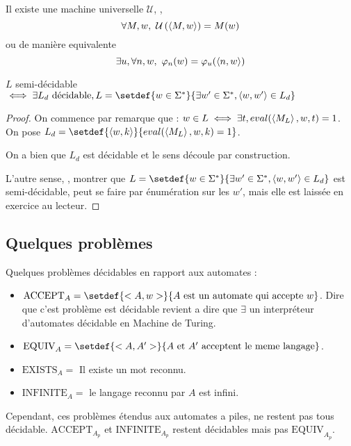 \begin{lemma}\label{lem:univ}
	Il existe une machine universelle $\mathcal U$, \ie, $$\forall M,w, \  \mathcal U \left(\left\langle M,w\right\rangle\right) = M (w)$$
	ou de manière equivalente
	$$\exists u, \forall n,w, \ \varphi_n(w) = \varphi_u(\left\langle n,w\right\rangle)$$
\end{lemma}



\begin{prop}
	$L$ semi-décidable $\iff \exists L_d \text{ décidable}, L = \setdef {w \in \mots} {\exists w' \in \mots, \encode{w,w'} \in L_d}$
\end{prop}


\begin{proof}
	On commence par remarque que : $w \in L \iff \exists t, eval(\left\langle M_L\right\rangle, w, t) = 1$. On pose
	$L_d = \setdef {\encode{w, k}} {eval(\encode {M_L}, w,k) = 1}$.

	On a bien que $L_d$ est décidable et le sens \bimpLR découle par construction.

	L'autre sense, \ie, montrer que $L = \setdef {w \in \mots} {\exists w' \in \mots, \encode{w,w'} \in L_d}$ est semi-décidable,
	peut se faire par énumération sur les $w'$, mais elle est laissée en exercice au lecteur.
\end{proof}


\subsection{Quelques problèmes}

Quelques problèmes décidables en rapport aux automates :

\begin{itemize}
	\item $\text{ACCEPT}_A = \setdef {<A,w>} {A \text { est un automate qui accepte } w}$.
	      Dire que c'est problème est décidable revient a dire que $\exists$ un interpréteur d'automates décidable en Machine de Turing.
	\item $\text{EQUIV}_A = \setdef {<A,A'>} {A \text { et } A' \text{ acceptent le meme langage}}$.
	\item $\text{EXISTS}_A = $ Il existe un mot reconnu.
	\item $\text{INFINITE}_A = $ le langage reconnu par $A$ est infini.
\end{itemize}

Cependant, ces problèmes étendus aux automates a piles, ne restent pas tous décidable.
$\text{ACCEPT}_{A_p}$ et $\text{INFINITE}_{A_p}$ restent décidables mais pas $\text{EQUIV}_{A_p}$.

